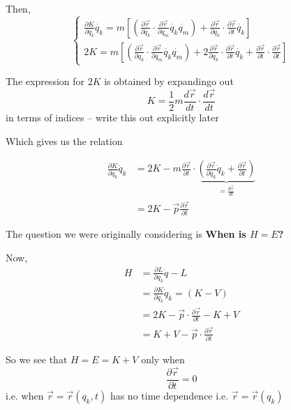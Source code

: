 \documentclass[11pt]{article}
\begin{document}
Then, 
\[ \begin{cases}
  \frac{\partial K}{\partial \dot{q_{k}}} \dot{q_{k}} = m \left[ \left( \frac{\partial \vec{r}}{\partial q_k} \cdot \frac{\partial \vec{r}}{\partial q_{m}} \dot{q_{k}} \dot{q_{m}}\right) + \frac{\partial \vec{r}}{\partial q_{k}} \cdot \frac{\partial \vec{r}}{\partial t} \dot{q_{k}} \right] \\
  2K = m \left[ \left( \frac{\partial \vec{r}}{\partial q_k} \cdot \frac{\partial \vec{r}}{\partial q_{m}} \dot{q_{k}} \dot{q_{m}}\right) + 2 \frac{\partial \vec{r}}{\partial q_{k}} \cdot \frac{\partial \vec{r}}{\partial t} \dot{q_{k}} + \frac{\partial \vec{r}}{\partial t} \cdot \frac{\partial \vec{r}}{\partial t}\right]
\end{cases} \]

\vskip 0.5cm
\begin{thought}
{
  The expression for $2K$ is obtained by expandingo out 
\[ K = \frac{1}{2}m \frac{d\vec{r}}{dt} \cdot \frac{d\vec{r}}{dt} \] 
in terms of indices -- write this out explicitly later
}
\end{thought}


\vskip 0.5cm
Which gives us the relation

\begin{align*}
  \frac{\partial K}{\partial \dot{q}_k} \dot{q}_k &= 2K - m \frac{\partial \vec{r}}{\partial t} \cdot \underbrace{\left( \frac{\partial \vec{r}}{\partial q_k} \dot{q}_k + \frac{\partial \vec{r}}{\partial t} \right) }_{ = \frac{d \vec{r}}{dt}} \\
  &= 2K - \vec{p} \frac{\partial \vec{r}}{\partial t}
\end{align*}

\vskip 0.5cm
The question we were originally considering is 
\color{blue} \textbf{When is $H = E$?} \color{black}

\vskip 0.5cm
Now,
\begin{align*}
  H &= \frac{\partial L}{\partial \dot{q}_k} \dot{q} - L \\
  &= \frac{\partial K}{\partial \dot{q}_k} \dot{q}_k = \left( K - V\right) \\
  &= 2K - \vec{p} \cdot \frac{\partial \vec{r}}{\partial t} - K + V \\
  &= K + V - \vec{p} \cdot \frac{\partial \vec{r}}{\partial t}
\end{align*}

\begin{redbox} 
So we see that $H = E = K + V$ only when \[ \frac{\partial \vec{r}}{\partial t} = 0 \] i.e. when $\vec{r} = \vec{r}(q_k, t)$ has no time dependence i.e. $\vec{r} = \vec{r}(q_k)$
\end{redbox}
\end{document}

